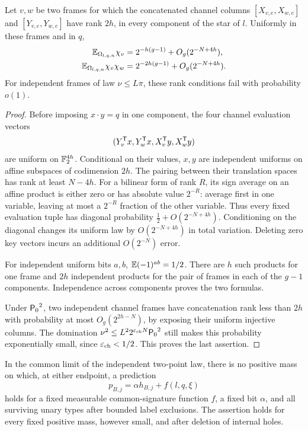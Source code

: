 \begin{lemma}
\label{lem:asym-channel-orthogonality}
Let \(v,w\) be two frames for which the concatenated channel
columns \([X_{v,e},X_{w,e}]\) and
\([Y_{v,e},Y_{w,e}]\) have rank \(2h\), in every component
of the star of \(l\).  Uniformly in these frames and in \(q\),
\begin{align}
 \mathbb E_{\Omega_{l,q,n}}\chi_v
   &=2^{-h(g-1)}+O_g(2^{-N+4h}),\label{eq:asym-channel-mean}\\
 \mathbb E_{\Omega_{l,q,n}}\chi_v\chi_w
   &=2^{-2h(g-1)}+O_g(2^{-N+4h}).
   \label{eq:asym-channel-correlation}
\end{align}
For independent frames of law \(\nu\le L\pi\), these rank
conditions fail with probability \(o(1)\).
\end{lemma}

\begin{proof}
Before imposing \(x\cdot y=q\) in one component, the four
channel evaluation vectors
\[
 (Y_v^{\mathsf T} x,Y_w^{\mathsf T} x,X_v^{\mathsf T} y,X_w^{\mathsf T} y)
\]
are uniform on \(\mathbb F_2^{4h}\).  Conditional on their values,
\(x,y\) are independent uniforms on affine subspaces of
codimension \(2h\).  The pairing between their translation
spaces has rank at least \(N-4h\).  For a bilinear form of
rank \(R\), its sign average on an affine product is either
zero or has absolute value \(2^{-R}\): average first in one
variable, leaving at most a \(2^{-R}\) fraction of the other
variable.  Thus every fixed evaluation tuple has diagonal
probability \(\frac12+O(2^{-N+4h})\).  Conditioning on the
diagonal changes its uniform law by \(O(2^{-N+4h})\) in total
variation.  Deleting zero key vectors incurs an additional
\(O(2^{-N})\) error.

For independent uniform bits \(a,b\),
\(\mathbb E(-1)^{ab}=1/2\).  There are \(h\) such products for one
frame and \(2h\) independent products for the pair of frames
in each of the \(g-1\) components.  Independence across
components proves the two formulas.

Under \({\mathsf P_0}^2\), two independent channel frames have
concatenation rank less than \(2h\) with probability at most
\(O_g(2^{2h-N})\), by exposing their uniform injective columns.
The domination
\(\nu^2\le L^2 2^{\varepsilon_{\rm ch}N}{\mathsf P_0}^2\)
still makes this probability exponentially small, since
\(\varepsilon_{\rm ch}<1/2\).  This proves the last assertion.
\end{proof}

\begin{lemma}
\label{lem:asym-no-point-prediction}
In the common limit of the independent two-point law, there is
no positive mass on which, at either endpoint, a prediction
\begin{equation}
\label{eq:asym-point-prediction}
 p_{B,j}=\alpha h_{B,j}+f(l,q,\xi)
\end{equation}
holds for a fixed measurable common-signature function \(f\),
a fixed bit \(\alpha\), and all surviving unary types after
bounded label exclusions.  The assertion holds for every fixed
positive mass, however small, and after deletion of internal holes.
\end{lemma}

